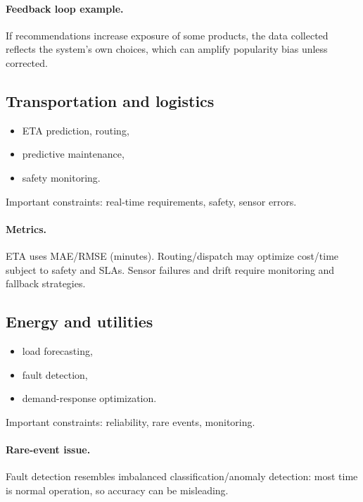 \documentclass[11pt]{article}
\begin{document}
\paragraph{Feedback loop example.}
If recommendations increase exposure of some products, the data collected reflects the system's own choices, which can amplify popularity bias unless corrected.

\subsection{Transportation and logistics}
\begin{itemize}[leftmargin=*]
  \item ETA prediction, routing,
  \item predictive maintenance,
  \item safety monitoring.
\end{itemize}
Important constraints: real-time requirements, safety, sensor errors.

\paragraph{Metrics.}
ETA uses MAE/RMSE (minutes). Routing/dispatch may optimize cost/time subject to safety and SLAs.
Sensor failures and drift require monitoring and fallback strategies.

\subsection{Energy and utilities}
\begin{itemize}[leftmargin=*]
  \item load forecasting,
  \item fault detection,
  \item demand-response optimization.
\end{itemize}
Important constraints: reliability, rare events, monitoring.

\paragraph{Rare-event issue.}
Fault detection resembles imbalanced classification/anomaly detection: most time is normal operation, so accuracy can be misleading.
\end{document}
